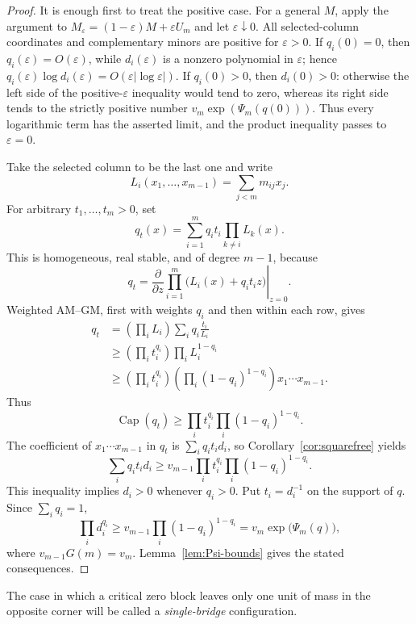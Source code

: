 \documentclass[11pt,a4paper]{article}
\numberwithin{equation}{section}
\theoremstyle{definition}
\newcommand{\pcap}{\operatorname{Cap}}
\newcommand{\1}{\mathbf{1}}
\newcommand{\eps}{\varepsilon}
\begin{document}
\begin{proof}
It is enough first to treat the positive case.  For a general $M$, apply
the argument to $M_\eps=(1-\eps)M+\eps U_m$ and let $\eps\downarrow0$.
All selected-column coordinates and complementary minors are positive for
$\eps>0$.  If $q_i(0)=0$, then $q_i(\eps)=O(\eps)$, while
$d_i(\eps)$ is a nonzero polynomial in $\eps$; hence
$q_i(\eps)\log d_i(\eps)=O(\eps|\log\eps|)$.  If $q_i(0)>0$, then
$d_i(0)>0$: otherwise the left side of the positive-$\eps$ inequality would
tend to zero, whereas its right side tends to the strictly positive number
$v_m\exp(\Psi_m(q(0)))$.  Thus every logarithmic term has the asserted
limit, and the product inequality passes to $\eps=0$.

Take the selected column to be the last one and write
\[
 L_i(x_1,\dots,x_{m-1})=\sum_{j<m}m_{ij}x_j.
\]
For arbitrary $t_1,\dots,t_m>0$, set
\[
 q_t(x)=\sum_{i=1}^m q_i t_i\prod_{k\ne i}L_k(x).
\]
This is homogeneous, real stable, and of degree $m-1$, because
\[
 q_t=
 \left.\frac{\partial}{\partial z}
 \prod_{i=1}^m\bigl(L_i(x)+q_it_i z\bigr)\right|_{z=0}.
\]
Weighted AM--GM, first with weights $q_i$ and then within each row, gives
\[
 \begin{aligned}
 q_t
 &=\left(\prod_iL_i\right)\sum_iq_i\frac{t_i}{L_i}\\
 &\ge\left(\prod_i t_i^{q_i}\right)
      \prod_iL_i^{1-q_i}\\
 &\ge\left(\prod_i t_i^{q_i}\right)
      \left(\prod_i(1-q_i)^{1-q_i}\right)
      x_1\cdots x_{m-1}.
 \end{aligned}
\]
Thus
\[
 \pcap(q_t)\ge
 \prod_i t_i^{q_i}\prod_i(1-q_i)^{1-q_i}.
\]
The coefficient of $x_1\cdots x_{m-1}$ in $q_t$ is
$\sum_iq_it_id_i$, so Corollary~\ref{cor:squarefree} yields
\[
 \sum_iq_it_id_i\ge
 v_{m-1}\prod_i t_i^{q_i}\prod_i(1-q_i)^{1-q_i}.
\]
This inequality implies $d_i>0$ whenever $q_i>0$.  Put $t_i=d_i^{-1}$
on the support of $q$.  Since $\sum_iq_i=1$,
\[
 \prod_i d_i^{q_i}
 \ge v_{m-1}\prod_i(1-q_i)^{1-q_i}
 =v_m\exp\bigl(\Psi_m(q)\bigr),
\]
where $v_{m-1}G(m)=v_m$.  Lemma~\ref{lem:Psi-bounds} gives the stated
consequences.
\end{proof}

The case in which a critical zero block leaves only one unit of mass in the
opposite corner will be called a \emph{single-bridge} configuration.
\end{document}
